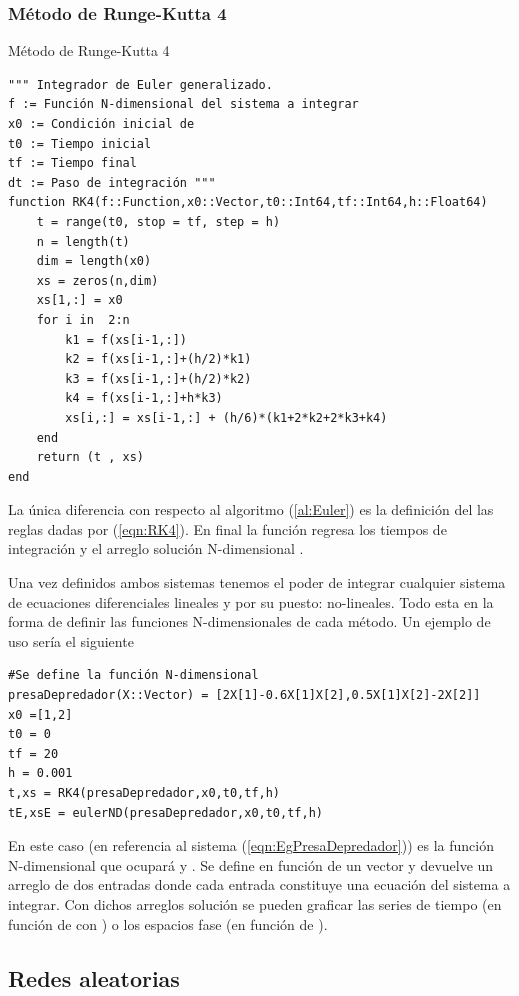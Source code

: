\subsubsection{Método de Runge-Kutta 4}

\begin{algorithm}
	\caption{Método de Runge-Kutta 4}
	\label{al:RK4}
	\begin{verbatim}
""" Integrador de Euler generalizado.
f := Función N-dimensional del sistema a integrar
x0 := Condición inicial de
t0 := Tiempo inicial
tf := Tiempo final
dt := Paso de integración """
function RK4(f::Function,x0::Vector,t0::Int64,tf::Int64,h::Float64)          
	t = range(t0, stop = tf, step = h)
	n = length(t)
	dim = length(x0)
	xs = zeros(n,dim)
	xs[1,:] = x0
	for i in  2:n
		k1 = f(xs[i-1,:])
		k2 = f(xs[i-1,:]+(h/2)*k1)
		k3 = f(xs[i-1,:]+(h/2)*k2)
		k4 = f(xs[i-1,:]+h*k3)
		xs[i,:] = xs[i-1,:] + (h/6)*(k1+2*k2+2*k3+k4)
	end
	return (t , xs)
end
	\end{verbatim}
	La única diferencia con respecto al algoritmo (\ref{al:Euler}) es la definición del las reglas dadas por (\ref{eqn:RK4}). En final la función regresa los tiempos de integración  y el arreglo solución N-dimensional .
\end{algorithm}

Una vez definidos ambos sistemas tenemos el poder de integrar cualquier sistema de ecuaciones diferenciales lineales y por su puesto: no-lineales. Todo esta en la forma de definir las funciones  N-dimensionales de cada método. Un ejemplo de uso sería el siguiente
\begin{verbatim}
#Se define la función N-dimensional
presaDepredador(X::Vector) = [2X[1]-0.6X[1]X[2],0.5X[1]X[2]-2X[2]]
x0 =[1,2]
t0 = 0
tf = 20
h = 0.001
t,xs = RK4(presaDepredador,x0,t0,tf,h)
tE,xsE = eulerND(presaDepredador,x0,t0,tf,h)
\end{verbatim}
En este caso  (en referencia al sistema (\ref{eqn:EgPresaDepredador})) es la función N-dimensional que ocupará  y . Se define en función de un vector  y devuelve un arreglo de dos entradas donde cada entrada constituye una ecuación del sistema a integrar. Con dichos arreglos solución se pueden graficar las series de tiempo (en función de  con ) o los espacios fase (en función de ).

\subsection{Redes aleatorias}\label{sec:RedesAleatorias}

